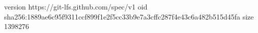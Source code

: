 version https://git-lfs.github.com/spec/v1
oid sha256:1889ae6c95f9311ccf899f1e2f5cc33b9e7a3cffc287f4e43c6a482b515d45fa
size 1398276
